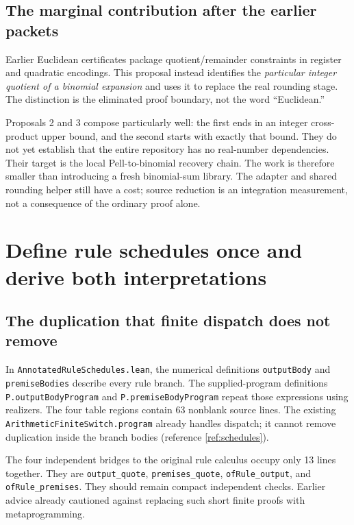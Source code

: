 \documentclass[11pt,a4paper]{article}
\newcommand{\code}[1]{\nolinkurl{#1}}
\begin{document}
\subsection{The marginal contribution after the earlier packets}

Earlier Euclidean certificates package quotient/remainder constraints in
register and quadratic encodings. This proposal instead identifies the
\emph{particular integer quotient of a binomial expansion} and uses it to
replace the real rounding stage. The distinction is the eliminated proof
boundary, not the word ``Euclidean.''

Proposals 2 and 3 compose particularly well: the first ends in an integer
cross-product upper bound, and the second starts with exactly that bound.
They do not yet establish that the entire repository has no real-number
dependencies. Their target is the local Pell-to-binomial recovery chain.
The work is therefore smaller than introducing a fresh binomial-sum library.
The adapter and shared rounding helper still have a cost; source reduction
is an integration measurement, not a consequence of the ordinary proof alone.

\section{Define rule schedules once and derive both interpretations}
\label{sec:schedules}

\subsection{The duplication that finite dispatch does not remove}

In \code{AnnotatedRuleSchedules.lean}, the numerical definitions
\code{outputBody} and \code{premiseBodies} describe every rule branch.
The supplied-program definitions \code{P.outputBodyProgram} and
\code{P.premiseBodyProgram} repeat those expressions using realizers.
The four table regions contain 63 nonblank source lines. The existing
\code{ArithmeticFiniteSwitch.program} already handles dispatch; it cannot
remove duplication inside the branch bodies (reference \ref{ref:schedules}).

The four independent bridges to the original rule calculus occupy only
13 lines together. They are \code{output_quote}, \code{premises_quote},
\code{ofRule_output}, and \code{ofRule_premises}. They should remain compact
independent checks. Earlier advice already cautioned against replacing such
short finite proofs with metaprogramming.
\end{document}
